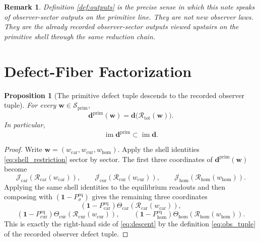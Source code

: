 \documentclass[11pt]{article}
\newcommand{\Car}{\mathrm{car}}
\newcommand{\Cur}{\mathrm{cur}}
\newcommand{\Hom}{\mathrm{hom}}
\newcommand{\Reduction}[1]{\mathcal R_{#1}}
\newcommand{\ReductionTriple}{\mathcal R_{\mathrm{tot}}}
\newcommand{\PrimShell}{\mathcal S_{\mathrm{prim}}}
\newcommand{\ObsCurrent}[1]{\mathcal J_{#1}}
\newcommand{\ObsTheta}[1]{\Theta_{#1}}
\newcommand{\EqProj}[1]{P_{#1}^{\mathrm{eq}}}
\newcommand{\DefectTuple}{\mathbf d}
\newcommand{\PrimDefectTuple}{\mathbf d^{\mathrm{prim}}}
\newtheorem{proposition}{Proposition}
\newtheorem{remark}{Remark}
\begin{document}
\begin{remark}
Definition \ref{def:outputs} is the precise sense in which this note speaks of observer-sector outputs on the primitive line. They are not new observer laws. They are the already recorded observer-sector outputs viewed upstairs on the primitive shell through the same reduction chain.
\end{remark}

\section{Defect-Fiber Factorization}

\begin{proposition}[The primitive defect tuple descends to the recorded observer tuple]
\label{prop:descent}
For every \(\mathbf w\in\PrimShell\),
\begin{equation}
\PrimDefectTuple(\mathbf w)
=
\DefectTuple\bigl(\ReductionTriple(\mathbf w)\bigr).
\label{eq:descent}
\end{equation}
In particular,
\[
\operatorname{im}\PrimDefectTuple\subset\operatorname{im}\DefectTuple.
\]
\end{proposition}

\begin{proof}
Write \(\mathbf w=(w_{\Car},w_{\Cur},w_{\Hom})\). Apply the shell identities \eqref{eq:shell_restriction} sector by sector. The first three coordinates of \(\PrimDefectTuple(\mathbf w)\) become
\[
\ObsCurrent{\Car}(\Reduction{\Car}(w_{\Car})),
\qquad
\ObsCurrent{\Cur}(\Reduction{\Cur}(w_{\Cur})),
\qquad
\ObsCurrent{\Hom}(\Reduction{\Hom}(w_{\Hom})).
\]
Applying the same shell identities to the equilibrium readouts and then composing with \((\mathbf 1-\EqProj{\sigma})\) gives the remaining three coordinates
\[
(\mathbf 1-\EqProj{\Car})\ObsTheta{\Car}(\Reduction{\Car}(w_{\Car})),
\]
\[
(\mathbf 1-\EqProj{\Cur})\ObsTheta{\Cur}(\Reduction{\Cur}(w_{\Cur})),
\qquad
(\mathbf 1-\EqProj{\Hom})\ObsTheta{\Hom}(\Reduction{\Hom}(w_{\Hom})).
\]
This is exactly the right-hand side of \eqref{eq:descent} by the definition \eqref{eq:obs_tuple} of the recorded observer defect tuple.
\end{proof}
\end{document}

